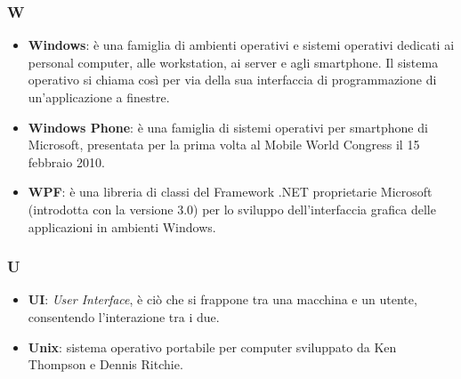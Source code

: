 \subsubsection{W}
\begin{itemize}
	\item \textbf{Windows}: è una famiglia di ambienti operativi e sistemi operativi dedicati ai personal computer, alle workstation, ai server e agli smartphone. Il sistema operativo si chiama così per via della sua interfaccia di programmazione di un'applicazione a finestre.
	\item \textbf{Windows Phone}: è una famiglia di sistemi operativi per smartphone di Microsoft, presentata per la prima volta al Mobile World Congress il 15 febbraio 2010.
	\item \textbf{WPF}: è una libreria di classi del Framework .NET proprietarie Microsoft (introdotta con la versione 3.0) per lo sviluppo dell'interfaccia grafica delle applicazioni in ambienti Windows.
	
	
\end{itemize}

\subsubsection{U}
\begin{itemize}
	\item \textbf{UI}: \textit{User Interface}, è ciò che si frappone tra una macchina e un utente, consentendo l'interazione tra i due.
	\item \textbf{Unix}: sistema operativo portabile per computer sviluppato da Ken Thompson e Dennis Ritchie.
\end{itemize}


